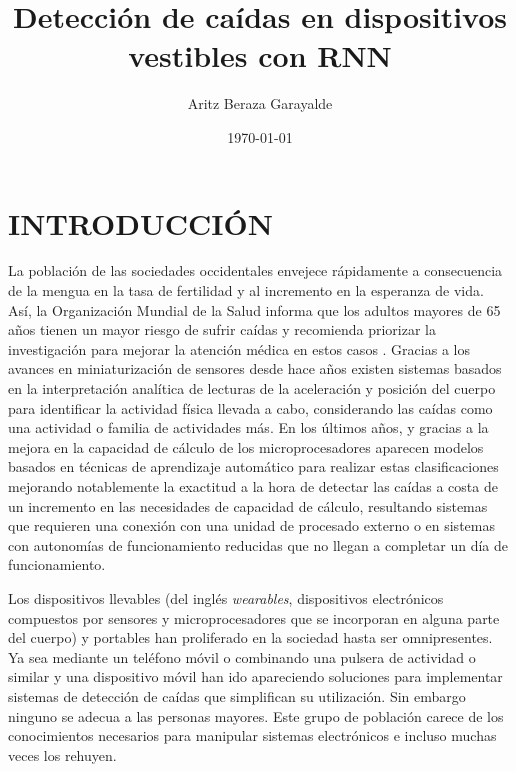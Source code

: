 \documentclass[11pt,a4paper,spanish,twocolumn]{article}
\title{Detección de caídas en dispositivos vestibles con RNN}
\author{Aritz Beraza Garayalde}
\date{\today}
\begin{document}
\twocolumn[
\begin{@twocolumnfalse}
\maketitle
\end{@twocolumnfalse}
]




\section{INTRODUCCIÓN}
La población de las sociedades occidentales envejece rápidamente a consecuencia de la mengua en la tasa de fertilidad y al incremento en la esperanza de vida. Así, la Organización Mundial de la Salud  informa que los adultos mayores de 65 años tienen un mayor riesgo de sufrir caídas y recomienda priorizar la investigación para mejorar la atención médica en estos casos \cite{FactsFalls2018}.
Gracias a los avances en miniaturización de sensores desde hace años existen sistemas basados en la interpretación analítica de lecturas de la aceleración y posición del cuerpo para identificar la actividad física llevada a cabo\cite{fallindex00,Chen2005,Bourke2006}, considerando las caídas como una actividad o familia de actividades más. En los últimos años, y gracias a la mejora en la capacidad de cálculo de los microprocesadores aparecen modelos basados en técnicas de aprendizaje automático para realizar estas clasificaciones\cite{Noury2007, Ozdemir2014} mejorando notablemente la exactitud a la hora de detectar las caídas a costa de un incremento en las necesidades de capacidad de cálculo, resultando sistemas que requieren una conexión con una unidad de procesado externo\cite{Yang2010} o en sistemas con autonomías de funcionamiento reducidas que no llegan a completar un día de funcionamiento\cite{Liu2020}.

Los dispositivos llevables (del inglés \emph{wearables}, dispositivos electrónicos compuestos por sensores y microprocesadores que se incorporan en alguna parte del cuerpo) y portables han proliferado en la sociedad hasta ser omnipresentes. Ya sea mediante un teléfono móvil\cite{tfall} o combinando una pulsera de actividad o similar y una dispositivo móvil\cite{Vilarinho2015} han ido apareciendo soluciones para implementar sistemas de detección de caídas que simplifican su utilización. Sin embargo ninguno se adecua a las personas mayores. Este grupo de población carece de los conocimientos necesarios para manipular sistemas electrónicos e incluso muchas veces los rehuyen.
\end{document}
